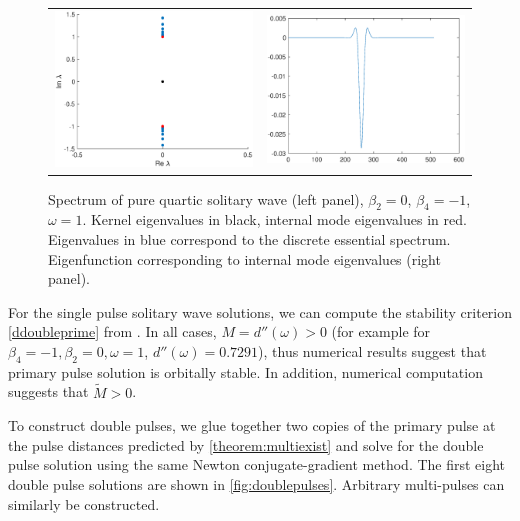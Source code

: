 \documentclass[12pt]{article}
\begin{document}
\begin{figure}[H]
\centering
\begin{tabular}{cc}
\includegraphics[width=8cm]{images/PQSspec.eps} &
\includegraphics[width=8cm]{images/PQSinternalmode.eps}
\end{tabular}
\caption{Spectrum of pure quartic solitary wave (left panel), $\beta_2 = 0$, $\beta_4 = -1$, $\omega = 1$. Kernel eigenvalues in black, internal mode eigenvalues in red. Eigenvalues in blue correspond to the discrete essential spectrum. Eigenfunction corresponding to internal mode eigenvalues (right panel).}
\label{fig:PQSspec}
\end{figure} 

For the single pulse solitary wave solutions, we can compute the stability criterion \cref{ddoubleprime} from \cite{Grillakis1987}. In all cases, $M = d''(\omega) > 0$ (for example for $\beta_4 = -1, \beta_2 = 0, \omega = 1$, $d''(\omega) = 0.7291$), thus numerical results suggest that primary pulse solution is orbitally stable. In addition, numerical computation suggests that $\tilde{M} > 0$.

To construct double pulses, we glue together two copies of the primary pulse at the pulse distances predicted by \cref{theorem:multiexist} and solve for the double pulse solution using the same Newton conjugate-gradient method. The first eight double pulse solutions are shown in \cref{fig:doublepulses}. Arbitrary multi-pulses can similarly be constructed.
\end{document}
